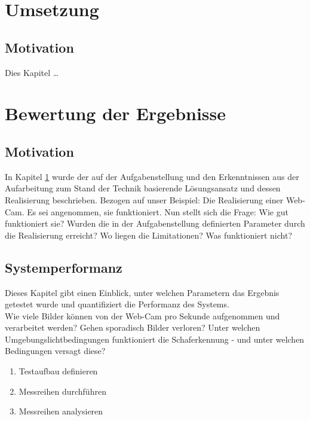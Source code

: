 \chapter{Umsetzung}
\label{sec:Umsetzung}

\section{Motivation}

Dies Kapitel \dots

\chapter{Bewertung der Ergebnisse}
\label{sec:Bewertung}

\section{Motivation}

In Kapitel \ref{sec:Umsetzung} wurde der auf der Aufgabenstellung und den Erkenntnissen aus der Aufarbeitung zum Stand der Technik basierende Lösungsansatz und dessen Realisierung beschrieben. Bezogen auf unser Beispiel: Die Realisierung einer Web-Cam. 
Es sei angenommen, sie funktioniert. Nun stellt sich die Frage: Wie gut funktioniert sie? Wurden die in der Aufgabenstellung definierten Parameter durch die Realisierung erreicht? Wo liegen die Limitationen? Was funktioniert nicht? 
 
\section{Systemperformanz}
\label{sec:Performanz}
 
Dieses Kapitel gibt einen Einblick, unter welchen Parametern das Ergebnis getestet wurde und quantifiziert die Performanz des Systems. \\

\example Wie viele Bilder können von der Web-Cam pro Sekunde aufgenommen und verarbeitet werden? Gehen sporadisch Bilder verloren? Unter welchen Umgebungslichtbedingungen funktioniert die Schaferkennung - und unter welchen Bedingungen versagt diese? 

\begin{enumerate}
\item Testaufbau definieren
\item Messreihen durchführen
\item Messreihen analysieren
\end{enumerate}

